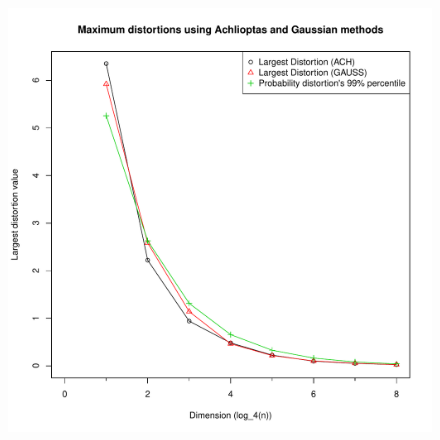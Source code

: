\documentclass[]{article}
\begin{document}
\begin{figure}
	\centering
	\includegraphics[width=\columnwidth]{maximum-distortions_log-scale.pdf}
	\caption{}
\end{figure}
\end{document}
